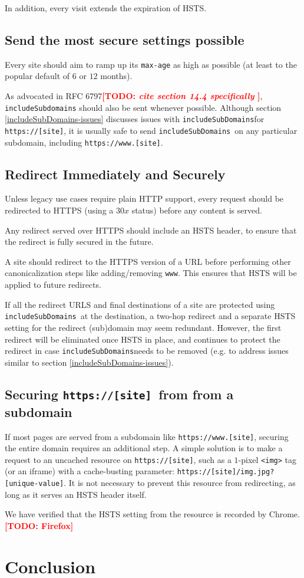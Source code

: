 \documentclass[conference]{./IEEEtran}
\newcommand{\todo}[1]{\textcolor{red}{\textbf{[TODO: #1]}}}
\newcommand{\td}[2]{\textcolor{red}{\textbf{[TODO: {\it{#1}} #2]}}}
\newcommand{\site}[1]{\texttt{#1}}
\newcommand{\code}[1]{\texttt{#1}}
\newcommand{\iSD}{{\code{includeSubDomains}}}
\newcommand{\genericsite}{[site]}
\newcommand{\s}{{\site{https://\genericsite}}}
\newcommand{\sw}{{\site{https://www.\genericsite}}}
\theoremstyle{plain}
\begin{document}
In addition, every visit extends the expiration of HSTS.

\subsection{Send the most secure settings possible}

Every site should aim to ramp up its \code{max-age} as high as possible (at least to the popular default of $6$ or $12$ months).

As advocated in RFC 6797\td{cite section 14.4 specifically}{\cite{rfc}}, \code{includeSubdomains} should also be sent whenever possible. Although section \ref{includeSubDomains-issues} discusses issues with \iSD for \s, it is usually safe to send \iSD~on any particular subdomain, including \sw.

\subsection{Redirect Immediately and Securely}

Unless legacy use cases require plain HTTP support, every request should be redirected to HTTPS (using a $30x$ status) before any content is served.

Any redirect served over HTTPS should include an HSTS header, to ensure that the redirect is fully secured in the future.

A site should redirect to the HTTPS version of a URL before performing other canonicalization steps like adding/removing \code{www}. This ensures that HSTS will be applied to future redirects.

If all the redirect URLS and final destinations of a site are protected using \iSD~at the destination, a two-hop redirect and a separate HSTS setting for the redirect (sub)domain may seem redundant. However, the first redirect will be eliminated once HSTS in place, and continues to protect the redirect in case \iSD needs to be removed (e.g. to address issues similar to section \ref{includeSubDomains-issues}).

\subsection{Securing \s~from from a subdomain}

If most pages are served from a subdomain like \sw, securing the entire domain requires an additional step. A simple solution is to make a request to an uncached resource on \s, such as a $1$-pixel \code{<img>} tag (or an iframe) with a cache-busting parameter: \site{\s/img.jpg?[unique-value]}. It is not necessary to prevent this resource from redirecting, as long as it serves an HSTS header itself.

We have verified that the HSTS setting from the resource is recorded by Chrome. \todo{Firefox}

\section{Conclusion}



\end{document}
